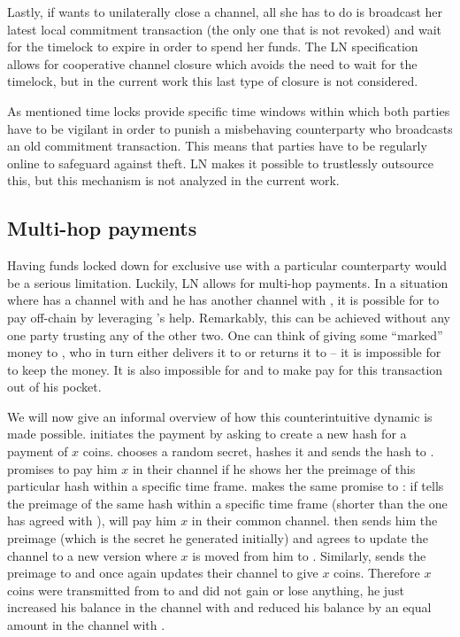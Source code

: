     Lastly, if \alice{} wants to unilaterally close a channel, all she has to do
    is broadcast her latest local commitment transaction (the only one that is
    not revoked) and wait for the timelock to expire in order to spend her
    funds. The LN specification allows for cooperative channel closure which
    avoids the need to wait for the timelock, but in the current work
    this last type of closure is not considered.

    As mentioned time locks provide specific time windows within which 
    both parties have to be
    vigilant in order to punish a misbehaving  counterparty who  broadcasts an old
    commitment transaction. This means that 
    parties have to be regularly online to
    safeguard against theft. LN makes it possible to trustlessly outsource this,
    but this mechanism is not analyzed in the current work.

  \subsection{Multi-hop payments}
  
    Having funds locked down for exclusive use with a particular counterparty
    would be a serious limitation. Luckily, LN allows for multi-hop payments. In
    a situation where \alice{} has a channel with \bob{} and he has another
    channel with \charlie{}, it is possible for \alice{} to pay \charlie{}
    off-chain by leveraging \bob's help. Remarkably, this can be achieved
    without any one party trusting any of the other two. One can think of
    \alice{} giving some ``marked'' money to \bob{}, who in turn either delivers
    it to \charlie{} or returns it to \alice{} -- it is impossible for \bob{} to
    keep the money. It is also impossible for \alice{} and \charlie{} to make
    \bob{} pay for this transaction out of his pocket.

    We will now give an informal overview of how this counterintuitive dynamic
    is made possible. \alice{} initiates the payment by asking \charlie{} to
    create a new hash for a payment of $x$ coins. \charlie{} chooses a random
    secret, hashes it and sends the hash to \alice. \alice{} promises \bob{} to
    pay him $x$ in their channel if he shows her the preimage of this particular
    hash within a specific time frame. \bob{} makes the same promise to
    \charlie{}: if \charlie{} tells \bob{} the preimage of the same hash within
    a specific time frame (shorter than the one \bob{} has agreed with
    \alice{}), \bob{} will pay him $x$ in their common channel. \charlie{} then
    sends him the preimage (which is the secret he generated initially) and
    \bob{} agrees to update the channel to a new version where $x$ is moved from
    him to \charlie. Similarly, \bob{} sends the preimage to \alice{} and once
    again \alice{} updates their channel to give \bob{} $x$ coins. Therefore $x$
    coins were transmitted from \alice{} to \charlie{} and \bob{} did not gain
    or lose anything, he just increased his balance in the channel with \alice{}
    and reduced his balance by an equal amount in the channel with \charlie.

